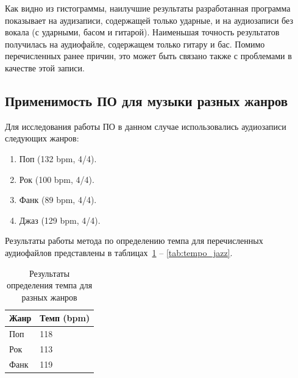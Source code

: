 
Как видно из гистограммы, наилучшие результаты разработанная программа показывает на аудизаписи, содержащей только ударные, и на аудиозаписи без вокала (с ударными, басом и гитарой). Наименьшая точность результатов получилась на аудиофайле, содержащем только гитару и бас. Помимо перечисленных ранее причин, это может быть связано также с проблемами в качестве этой записи.

\newpage

\subsection{Применимость ПО для музыки разных жанров}

Для исследования работы ПО в данном случае использовались аудиозаписи следующих жанров:

\begin{enumerate}
	\item Поп (132 bpm, 4/4).
	\item Рок (100 bpm, 4/4).
	\item Фанк (89 bpm, 4/4).
	\item Джаз (129 bpm, 4/4).
\end{enumerate}

Результаты работы метода по определению темпа для перечисленных аудиофайлов представлены в таблицах~\ref{tab:tempo_genres} -- \ref{tab:tempo_jazz}.

\begin{table}[!h]
	\begin{center}
		\caption{\label{tab:tempo_genres}Результаты определения темпа для разных жанров}
		\begin{tabular}{|p{8cm}|p{8cm}|}
			\hline
			\textbf{Жанр} & \textbf{Темп (bpm)}\\
			\hline
			Поп & 118\\
			\hline
			Рок & 113\\
			\hline
			Фанк & 119\\
			\hline
		\end{tabular}
	\end{center}
\end{table}

